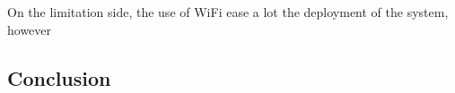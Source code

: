 On the limitation side, the use of WiFi ease a lot the deployment of the system, however

\subsection{Conclusion}

